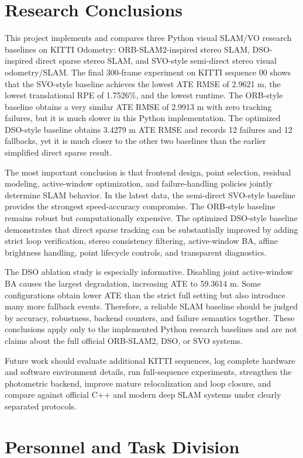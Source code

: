 \documentclass[11pt,a4paper]{article}
\newcommand{\methodorb}{ORB-SLAM2-inspired stereo SLAM}
\newcommand{\methoddso}{DSO-inspired direct sparse stereo SLAM}
\newcommand{\methodsvo}{SVO-style semi-direct stereo visual odometry/SLAM}
\begin{document}
\section{Research Conclusions}

This project implements and compares three Python visual SLAM/VO research baselines on KITTI Odometry: \methodorb{}, \methoddso{}, and \methodsvo{}. The final 300-frame experiment on KITTI sequence 00 shows that the SVO-style baseline achieves the lowest ATE RMSE of 2.9621 m, the lowest translational RPE of 1.7526\%, and the lowest runtime. The ORB-style baseline obtains a very similar ATE RMSE of 2.9913 m with zero tracking failures, but it is much slower in this Python implementation. The optimized DSO-style baseline obtains 3.4279 m ATE RMSE and records 12 failures and 12 fallbacks, yet it is much closer to the other two baselines than the earlier simplified direct sparse result.

The most important conclusion is that frontend design, point selection, residual modeling, active-window optimization, and failure-handling policies jointly determine SLAM behavior. In the latest data, the semi-direct SVO-style baseline provides the strongest speed-accuracy compromise. The ORB-style baseline remains robust but computationally expensive. The optimized DSO-style baseline demonstrates that direct sparse tracking can be substantially improved by adding strict loop verification, stereo consistency filtering, active-window BA, affine brightness handling, point lifecycle controls, and transparent diagnostics.

The DSO ablation study is especially informative. Disabling joint active-window BA causes the largest degradation, increasing ATE to 59.3614 m. Some configurations obtain lower ATE than the strict full setting but also introduce many more fallback events. Therefore, a reliable SLAM baseline should be judged by accuracy, robustness, backend counters, and failure semantics together. These conclusions apply only to the implemented Python research baselines and are not claims about the full official ORB-SLAM2, DSO, or SVO systems.

Future work should evaluate additional KITTI sequences, log complete hardware and software environment details, run full-sequence experiments, strengthen the photometric backend, improve mature relocalization and loop closure, and compare against official C++ and modern deep SLAM systems under clearly separated protocols.

\section{Personnel and Task Division}
\end{document}
